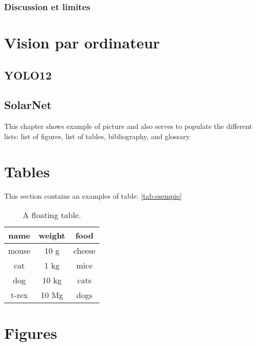 \subsubsection{Discussion et limites}

\section{Vision par ordinateur}

\subsection{YOLO12}

\subsection{SolarNet}


\newpage

This chapter shows example of picture and also serves to populate the different lists: list of figures, list of tables, bibliography, and glossary.

\section{Tables}

This section contains an examples of table: \autoref{tab:esempio}

\begin{table}[h]
	\centering
	\begin{tabular}{ccc}
		\toprule
		name & weight & food \\ 
		\midrule
		mouse	& 10 g	& cheese \\
		cat	& 1 kg	& mice \\
		dog	& 10 kg	& cats \\
		t-rex	& 10 Mg	& dogs \\
		\bottomrule 
	\end{tabular}
	\caption[A floating table]{A floating table.}
	\label{tab:esempio}
\end{table}

\section{Figures}

